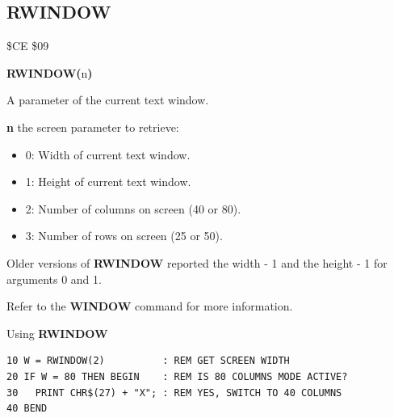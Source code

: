 
\newpage
\subsection{RWINDOW}
\begin{description}[leftmargin=2cm,style=nextline]
\item [Token:]    \$CE \$09

\item [Format:]   {\bf RWINDOW(}n{\bf)}

\item [Returns:]  A parameter of the current text window.

                  {\bf n} the screen parameter to retrieve:

                  \begin{itemize}
                     \item 0: Width of current text window.
                     \item 1: Height of current text window.
                     \item 2: Number of columns on screen (40 or 80).
                     \item 3: Number of rows on screen (25 or 50).
                  \end{itemize}

\item [Remarks:]  Older versions of {\bf RWINDOW} reported the width - 1 and the height - 1 for arguments 0 and 1.

                  Refer to the {\bf WINDOW} command for more information.

\item [Example:]  Using {\bf RWINDOW}

\begin{tcolorbox}[colback=black,coltext=white]
\verbatimfont{\codefont}
\begin{verbatim}
10 W = RWINDOW(2)          : REM GET SCREEN WIDTH
20 IF W = 80 THEN BEGIN    : REM IS 80 COLUMNS MODE ACTIVE?
30   PRINT CHR$(27) + "X"; : REM YES, SWITCH TO 40 COLUMNS
40 BEND
\end{verbatim}
\end{tcolorbox}
\end{description}


\newpage
